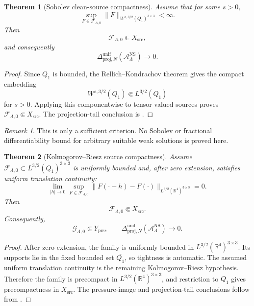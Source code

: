 \documentclass[11pt]{article}
\numberwithin{equation}{section}
\newtheorem{theorem}{Theorem}[section]
\theoremstyle{definition}
\theoremstyle{remark}
\newtheorem{remark}[remark]{Remark}
\newcommand{\R}{\mathbb{R}}
\newcommand{\NS}{\mathrm{NS}}
\newcommand{\src}{\mathrm{src}}
\begin{document}
\begin{theorem}[Sobolev clean-source compactness]
\label{thm:sobolev-source-compactness}
Assume that for some \(s>0\),
\[
    \sup_{F\in\mathcal F_{\Lambda,0}}
    \|F\|_{W^{s,3/2}(Q_1)^{3\times3}}
    <\infty.
\]
Then
\[
    \mathcal F_{\Lambda,0}\Subset X_{\src},
\]
and consequently
\[
    \Delta_{\mathrm{proj},N}^{\mathrm{unif}}
    (\mathcal A_{\Lambda}^{\NS})\to0.
\]
\end{theorem}

\begin{proof}
Since \(Q_1\) is bounded, the Rellich--Kondrachov theorem gives the compact
embedding
\[
    W^{s,3/2}(Q_1)\Subset L^{3/2}(Q_1)
\]
for \(s>0\).  Applying this componentwise to tensor-valued sources proves
\(\mathcal F_{\Lambda,0}\Subset X_{\src}\).  The projection-tail conclusion is
.
\end{proof}

\begin{remark}
This is only a sufficient criterion.  No Sobolev or fractional differentiability
bound for arbitrary suitable weak solutions is proved here.
\end{remark}

\begin{theorem}[Kolmogorov--Riesz source compactness]
\label{thm:kolmogorov-source-compactness}
Assume \(\mathcal F_{\Lambda,0}\subset L^{3/2}(Q_1)^{3\times3}\) is uniformly
bounded and, after zero extension, satisfies uniform translation continuity:
\[
    \lim_{|h|\to0}
    \sup_{F\in\mathcal F_{\Lambda,0}}
    \|F(\cdot+h)-F(\cdot)\|_{L^{3/2}(\R^4)^{3\times3}}
    =
    0.
\]
Then
\[
    \mathcal F_{\Lambda,0}\Subset X_{\src}.
\]
Consequently,
\[
    \mathcal G_{\Lambda,0}\Subset Y_{\mathrm{prs}},
    \qquad
    \Delta_{\mathrm{proj},N}^{\mathrm{unif}}
    (\mathcal A_{\Lambda}^{\NS})\to0.
\]
\end{theorem}

\begin{proof}
After zero extension, the family is uniformly bounded in
\(L^{3/2}(\R^4)^{3\times3}\).  Its supports lie in the fixed bounded set
\(\overline{Q_1}\), so tightness is automatic.  The assumed uniform translation
continuity is the remaining Kolmogorov--Riesz hypothesis.  Therefore the family
is precompact in \(L^{3/2}(\R^4)^{3\times3}\), and restriction to \(Q_1\) gives
precompactness in \(X_{\src}\).  The pressure-image and projection-tail
conclusions follow from .
\end{proof}
\end{document}
